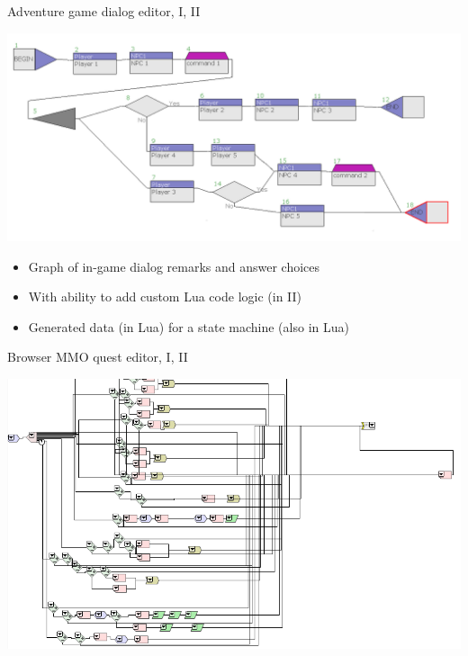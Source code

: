 \documentclass[handout]{beamer}
\begin{document}
\begin{frame}{Adventure game dialog editor, I, II}

\includegraphics[height=.4\textheight]{adventure}

\begin{itemize}
\item Graph of in-game dialog remarks and answer choices
\item With ability to add custom Lua code logic (in II)
\item Generated data (in Lua) for a state machine (also in Lua)
\end{itemize}

\end{frame}


\begin{frame}{Browser MMO quest editor, I, II}

\includegraphics[height=.8\textheight]{browser}

\end{frame}

\end{document}
